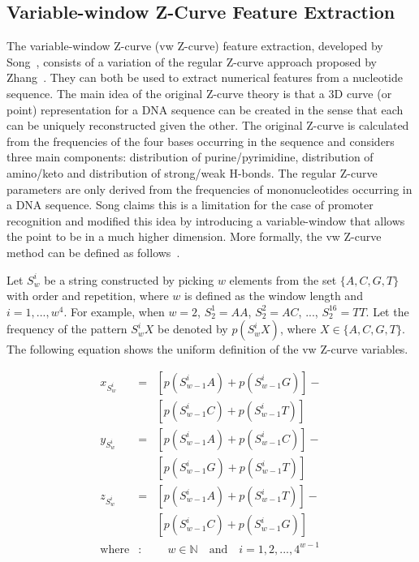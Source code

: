 \documentclass[conference]{IEEEtran}
\begin{document}
\subsection{Variable-window Z-Curve Feature Extraction}

The variable-window Z-curve (vw Z-curve) feature extraction, developed by Song~\cite{song2011a}, consists of a variation of the regular Z-curve approach proposed by Zhang~\cite{zhang1997}. They can both be used to extract numerical features from a nucleotide sequence. The main idea of the original Z-curve theory is that a 3D curve (or point) representation for a DNA sequence can be created in the sense that each can be uniquely reconstructed given the other. The original Z-curve is calculated from the frequencies of the four bases occurring in the sequence and considers three main components: distribution of purine/pyrimidine, distribution of amino/keto and distribution of strong/weak H-bonds. The regular Z-curve parameters are only derived from the frequencies of mononucleotides occurring in a DNA sequence. Song claims this is a limitation for the case of promoter recognition and modified this idea by introducing a variable-window that allows the point to be in a much higher dimension. More formally, the vw Z-curve method can be defined as follows~\cite{song2011a}.

Let $ S_{w}^{i} $ be a string constructed by picking $ w $ elements from the set $ \{A,C,G,T\} $ with order and repetition, where $ w $ is defined as the window length and $ i = 1, ..., w^{4} $. For example, when $ w = 2 $, $ S_{2}^{1} = AA $, $ S_{2}^{2} = AC $, ..., $ S_{2}^{16} = TT $. Let the frequency of the pattern $ S_{w}^{i}X $ be denoted by $ p\left(S_{w}^{i}X\right) $, where $ X \in \{A,C,G,T\} $. The following equation shows the uniform definition of the vw Z-curve variables.

\begin{equation}
    \begin{array}{lcl}
        x_{S_{w}^{i}} & = & [p\left(S_{w-1}^{i}A\right) + p\left(S_{w-1}^{i}G\right)] - \\
                      &   & [p\left(S_{w-1}^{i}C\right) + p\left(S_{w-1}^{i}T\right)] \\[0.3cm]
        y_{S_{w}^{i}} & = & [p\left(S_{w-1}^{i}A\right) + p\left(S_{w-1}^{i}C\right)] - \\
                      &   & [p\left(S_{w-1}^{i}G\right) + p\left(S_{w-1}^{i}T\right)] \\[0.3cm]
        z_{S_{w}^{i}} & = & [p\left(S_{w-1}^{i}A\right) + p\left(S_{w-1}^{i}T\right)] - \\
                      &   & [p\left(S_{w-1}^{i}C\right) + p\left(S_{w-1}^{i}G\right)] \\[0.3cm]
        \text{where}  & : & \quad w \in \mathbb{N} \quad \text{and} \quad i = 1, 2, ..., 4^{w-1} \\
    \end{array} 
    \label{eq:xdef}
\end{equation}
\end{document}
